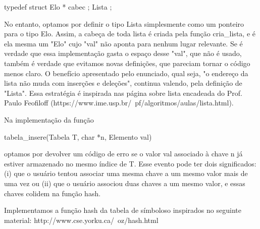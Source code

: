 \documentclass{article}
\begin{document}
\begin{spverbatim}
  typedef struct {
  Elo * cabec ;
} Lista ;
\end{spverbatim} \medskip

No entanto, optamos por definir o tipo Lista simplesmente como um ponteiro para o tipo Elo. Assim, a cabeça de toda lista é criada pela função cria\_lista, e é ela mesma um "Elo" cujo "val" não aponta para nenhum lugar relevante. Se é verdade que essa implementação gasta o espaço desse "val", que não é usado, também é verdade que evitamos novas definições, que pareciam tornar o código menos claro. O benefício apresentado pelo enunciado, qual seja, "o endereço da lista não muda com inserções e deleções", continua valendo, pela definição de "Lista". Essa estratégia é inspirada nas página sobre lista encadeada do Prof. Paulo Feofiloff (https://www.ime.usp.br/~pf/algoritmos/aulas/lista.html).

Na implementação da função
\begin{spverbatim}
  tabela\_insere(Tabela T, char *n, Elemento val)
\end{spverbatim} \medskip
optamos por devolver um código de erro se o valor val associado à chave n já estiver armazenado no mesmo índice de T. Esse evento pode ter dois significados: (i) que o usuário tentou associar uma mesma chave a um mesmo valor mais de uma vez ou (ii) que o usuário associou duas chaves a um mesmo valor, e essas chaves colidem na função hash.

Implementamos a função hash da tabela de símboloso inspirados no seguinte material: http://www.cse.yorku.ca/~oz/hash.html 
\end{document}
